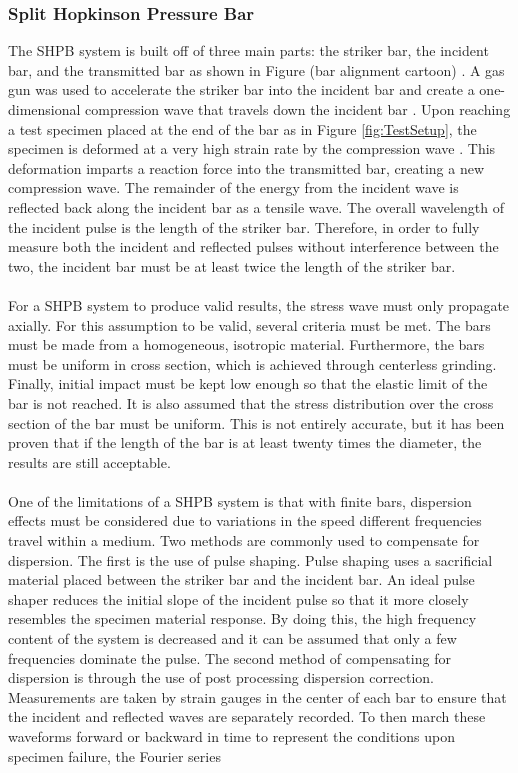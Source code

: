 \documentclass[12pt]{article}
\begin{document}
\subsubsection {Split Hopkinson Pressure Bar} %
The SHPB system is built off of three main parts: the striker bar, the incident bar, and the transmitted bar as shown in Figure (bar alignment cartoon) \cite{Frew2002} \cite{Follansbee} \cite{Frew}. A gas gun was used to accelerate the striker bar into the incident bar and create a one-dimensional compression wave that travels down the incident bar \cite{Frew}. Upon reaching a test specimen placed at the end of the bar as in Figure \ref{fig:TestSetup}, the specimen is deformed at a very high strain rate by the compression wave \cite{Dai}. This deformation imparts a reaction force into the transmitted bar, creating a new compression wave. The remainder of the energy from the incident wave is reflected back along the incident bar as a tensile wave. The overall wavelength of the incident pulse is the length of the striker bar. Therefore, in order to fully measure both the incident and reflected pulses without interference between the two, the incident bar must be at least twice the length of the striker bar.
\\ \\
For a SHPB system to produce valid results, the stress wave must only propagate axially. For this assumption to be valid, several criteria must be met. The bars must be made from a homogeneous, isotropic material. Furthermore, the bars must be uniform in cross section, which is achieved through centerless grinding. Finally, initial impact must be kept low enough so that the elastic limit of the bar is not reached. It is also assumed that the stress distribution over the cross section of the bar must be uniform. This is not entirely accurate, but it has been proven that if the length of the bar is at least twenty times the diameter, the results are still acceptable. 
\\ \\
One of the limitations of a SHPB system is that with finite bars, dispersion effects must be considered due to variations in the speed different frequencies travel within a medium. Two methods are commonly used to compensate for dispersion. The first is the use of pulse shaping. Pulse shaping uses a sacrificial material placed between the striker bar and the incident bar. An ideal pulse shaper reduces the initial slope of the incident pulse so that it more closely resembles the specimen material response. By doing this, the high frequency content of the system is decreased and it can be assumed that only a few frequencies dominate the pulse. The second method of compensating for dispersion is through the use of post processing dispersion correction. Measurements are taken by strain gauges in the center of each bar to ensure that the incident and reflected waves are separately recorded. To then march these waveforms forward or backward in time to represent the conditions upon specimen failure, the Fourier series
\end{document}

